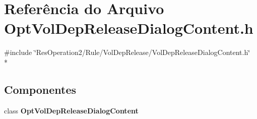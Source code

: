 \section{Referência do Arquivo Opt\+Vol\+Dep\+Release\+Dialog\+Content.\+h}
\label{_opt_vol_dep_release_dialog_content_8h}
{\ttfamily \#include \char`\"{}Res\+Operation2/\+Rule/\+Vol\+Dep\+Release/\+Vol\+Dep\+Release\+Dialog\+Content.\+h\char`\"{}}\\*
\subsection*{Componentes}
\begin{DoxyCompactItemize}
\item 
class {\bf Opt\+Vol\+Dep\+Release\+Dialog\+Content}
\end{DoxyCompactItemize}
